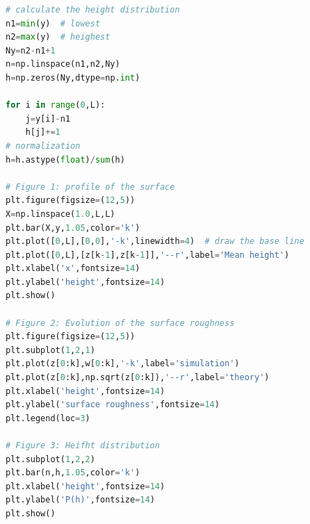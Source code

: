 \begin{lstlisting}[language=python]
# calculate the height distribution
n1=min(y)  # lowest
n2=max(y)  # heighest
Ny=n2-n1+1
n=np.linspace(n1,n2,Ny)
h=np.zeros(Ny,dtype=np.int)

for i in range(0,L):
    j=y[i]-n1
    h[j]+=1
# normalization
h=h.astype(float)/sum(h)

# Figure 1: profile of the surface
plt.figure(figsize=(12,5))
X=np.linspace(1.0,L,L)
plt.bar(X,y,1.05,color='k')
plt.plot([0,L],[0,0],'-k',linewidth=4)  # draw the base line
plt.plot([0,L],[z[k-1],z[k-1]],'--r',label='Mean height')
plt.xlabel('x',fontsize=14)
plt.ylabel('height',fontsize=14)
plt.show()

# Figure 2: Evolution of the surface roughness
plt.figure(figsize=(12,5))
plt.subplot(1,2,1)
plt.plot(z[0:k],w[0:k],'-k',label='simulation')
plt.plot(z[0:k],np.sqrt(z[0:k]),'--r',label='theory')
plt.xlabel('height',fontsize=14)
plt.ylabel('surface roughness',fontsize=14)
plt.legend(loc=3)

# Figure 3: Heifht distribution
plt.subplot(1,2,2)
plt.bar(n,h,1.05,color='k')
plt.xlabel('height',fontsize=14)
plt.ylabel('P(h)',fontsize=14)
plt.show()
\end{lstlisting}
\normalsize

